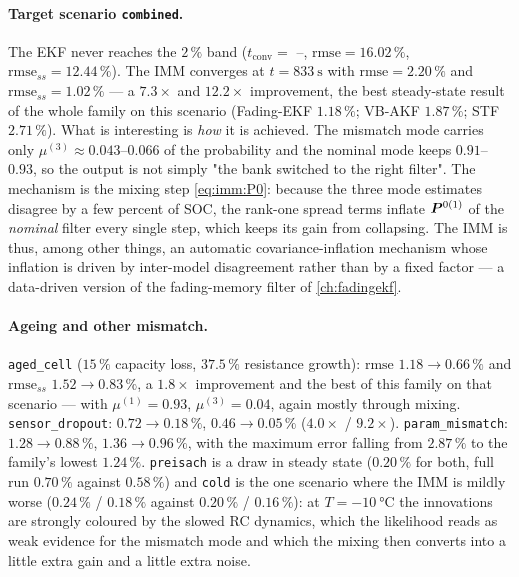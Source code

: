 \paragraph{Target scenario \texttt{combined}.}  The EKF never reaches the $2\,\%$ band
($t_\mathrm{conv}=$ --, $\mathrm{rmse}=16.02\,\%$, $\mathrm{rmse}_{ss}=12.44\,\%$).  The IMM converges
at $t=\SI{833}{\second}$ with $\mathrm{rmse}=2.20\,\%$ and
$\mathrm{rmse}_{ss}=\mathbf{1.02\,\%}$ --- a $7.3\times$ and $\mathbf{12.2\times}$ improvement, the
best steady-state result of the whole family on this scenario (Fading-EKF $1.18\,\%$; VB-AKF
$1.87\,\%$; STF $2.71\,\%$).  What is interesting is \emph{how} it is achieved.  The mismatch mode
carries only $\mu^{(3)}\approx0.043$--$0.066$ of the probability and the nominal mode keeps
$0.91$--$0.93$, so the output is not simply "the bank switched to the right filter".  The mechanism is
the mixing step \eqref{eq:imm:P0}: because the three mode estimates disagree by a few percent of SOC,
the rank-one spread terms inflate $\bm{P}^{0(1)}$ of the \emph{nominal} filter every single step, which
keeps its gain from collapsing.  The IMM is thus, among other things, an automatic
covariance-inflation mechanism whose inflation is driven by inter-model disagreement rather than by a
fixed factor --- a data-driven version of the fading-memory filter of \cref{ch:fadingekf}.

\paragraph{Ageing and other mismatch.}  \texttt{aged\_cell} ($15\,\%$ capacity loss, $37.5\,\%$
resistance growth): $\mathrm{rmse}$ $1.18\to\mathbf{0.66\,\%}$ and $\mathrm{rmse}_{ss}$
$1.52\to\mathbf{0.83\,\%}$, a $1.8\times$ improvement and the best of this family on that scenario ---
with $\mu^{(1)}=0.93$, $\mu^{(3)}=0.04$, again mostly through mixing.  \texttt{sensor\_dropout}:
$0.72\to0.18\,\%$, $0.46\to0.05\,\%$ ($4.0\times$ / $9.2\times$).  \texttt{param\_mismatch}:
$1.28\to0.88\,\%$, $1.36\to0.96\,\%$, with the maximum error falling from $2.87\,\%$ to the family's
lowest $1.24\,\%$.  \texttt{preisach} is a draw in steady state ($0.20\,\%$ for both, full run
$0.70\,\%$ against $0.58\,\%$) and \texttt{cold} is the one scenario where the IMM is mildly worse
($0.24\,\%$ / $0.18\,\%$ against $0.20\,\%$ / $0.16\,\%$): at $T=\SI{-10}{\celsius}$ the innovations
are strongly coloured by the slowed RC dynamics, which the likelihood reads as weak evidence for the
mismatch mode and which the mixing then converts into a little extra gain and a little extra noise.

